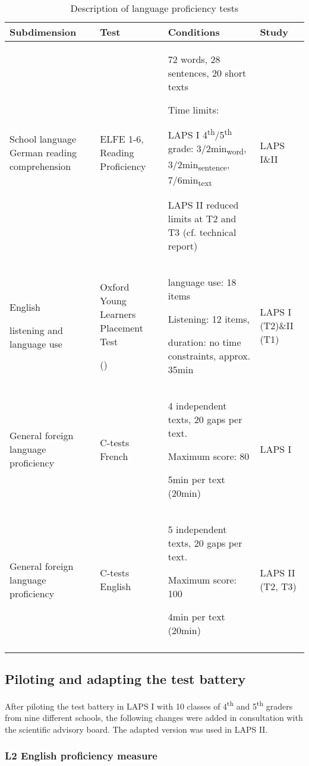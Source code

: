 \documentclass[output=paper]{langsci/langscibook}
\begin{document}
\begin{table}\footnotesize
\begin{tabularx}{\textwidth}{QQQl}
\lsptoprule
{Subdimension} & {Test} & {Conditions} & {Study}\\\midrule
School language German reading comprehension & ELFE 1-6, Reading Proficiency \citep{LenhardSchneider2006} & 72 words, 28 sentences, 20 short texts

Time limits:

LAPS I 4\textsuperscript{th}/5\textsuperscript{th} grade: 3/2min\textsubscript{word}, 3/2min\textsubscript{sentence}, 7/6min\textsubscript{text}

LAPS II reduced limits at T2 and T3 (cf. technical report) & LAPS I\&II\\
English 

listening and language use & Oxford Young Learners Placement Test

(\citealt{Testing2013}) & language use: 18 items

Listening: 12 items,

duration: no time constraints, approx. 35min & LAPS I (T2)\&II (T1)\\
General foreign language proficiency & C-tests French & 4 independent texts, 20 gaps per text.

Maximum score: 80

5min per text (20min) & LAPS I\\
General foreign language proficiency & C-tests English & 5 independent texts, 20 gaps per text.

Maximum score: 100

4min per text (20min) & LAPS II (T2, T3)\\
\lspbottomrule
\end{tabularx}
\caption{Description of language proficiency tests\label{tab:tests:part-4}}
\end{table}

\subsection{Piloting and adapting the test battery}\label{sec:02:3.6}

After piloting the test battery in LAPS I with 10 classes of 4\textsuperscript{th} and 5\textsuperscript{th} graders from nine different schools, the following changes were added in consultation with the scientific advisory board. The adapted version was used in LAPS II.

\subsubsection{L2 English proficiency measure}
\end{document}
